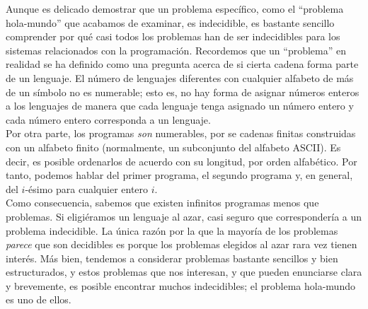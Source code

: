 Aunque es delicado demostrar que un problema específico, como el ``problema hola-mundo'' que acabamos de examinar, es indecidible, es bastante sencillo comprender por qué casi todos los problemas han de ser indecidibles para los sistemas relacionados con la programación. Recordemos que un ``problema'' en realidad se ha definido como una pregunta acerca de si cierta cadena forma parte de un lenguaje. El número de lenguajes diferentes con cualquier alfabeto de más de un símbolo no es numerable; esto es, no hay forma de asignar números enteros a los lenguajes de manera que cada lenguaje tenga asignado un número entero y cada número entero corresponda a un lenguaje. \\

Por otra parte, los programas \emph{son} numerables, por se cadenas finitas construidas con un alfabeto finito (normalmente, un subconjunto del alfabeto ASCII). Es decir, es posible ordenarlos de acuerdo con su longitud, por orden alfabético. Por tanto, podemos hablar del primer programa, el segundo programa y, en general, del $i$-ésimo para cualquier entero $i$.\\

Como consecuencia, sabemos que existen infinitos programas menos que problemas. Si eligiéramos un lenguaje al azar, casi seguro que correspondería a un problema indecidible. La única razón por la que la mayoría de los problemas \emph{parece} que son decidibles es porque los problemas elegidos al azar rara vez tienen interés. Más bien, tendemos a considerar problemas bastante sencillos y bien estructurados, y estos problemas que nos interesan, y que pueden enunciarse clara y brevemente, es posible encontrar muchos indecidibles; el problema hola-mundo es uno de ellos.\\


